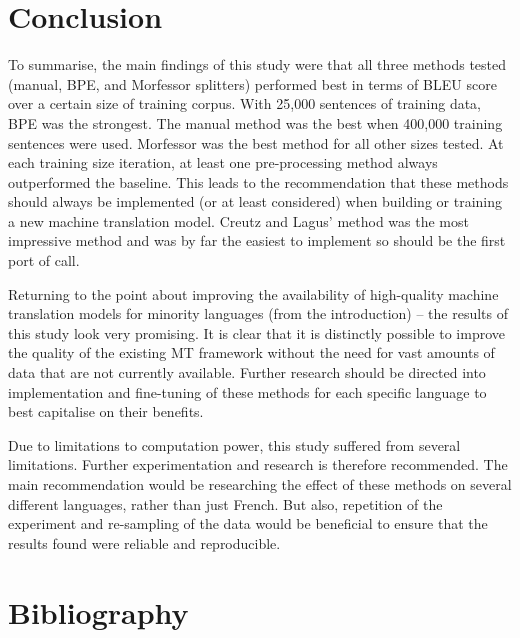 \documentclass[11pt]{article}
\begin{document}
\newpage

\section{Conclusion}

To summarise, the main findings of this study were that all three methods tested (manual, BPE, and Morfessor splitters) performed best in terms of BLEU score over a certain size of training corpus. With 25,000 sentences of training data, BPE was the strongest. The manual method was the best when 400,000 training sentences were used. Morfessor was the best method for all other sizes tested. At each training size iteration, at least one pre-processing method always outperformed the baseline. This leads to the recommendation that these methods should always be implemented (or at least considered) when building or training a new machine translation model. Creutz and Lagus' \citeyearpar{creutz-lagus-2002-unsupervised} method was the most impressive method and was by far the easiest to implement so should be the first port of call.

\bigskip

Returning to the point about improving the availability of high-quality machine translation models for minority languages (from the introduction) -- the results of this study look very promising. It is clear that it is distinctly possible to improve the quality of the existing MT framework without the need for vast amounts of data that are not currently available. Further research should be directed into implementation and fine-tuning of these methods for each specific language to best capitalise on their benefits.

\bigskip

Due to limitations to computation power, this study suffered from several limitations. Further experimentation and research is therefore recommended. The main recommendation would be researching the effect of these methods on several different languages, rather than just French. But also, repetition of the experiment and re-sampling of the data would be beneficial to ensure that the results found were reliable and reproducible.

\newpage

\section{Bibliography}


\end{document}
